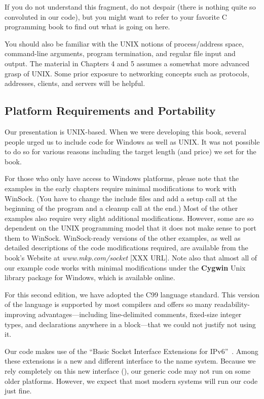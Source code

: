 If you do not understand this fragment, do not despair (there is
nothing quite so convoluted in our code), but you might want to refer
to your favorite C programming book to find out what is going on here.

You should also be familiar with the UNIX notions of process/address
space, command-line arguments, program termination, and regular file
input and output. The material in Chapters 4 and 5 assumes a somewhat
more advanced grasp of UNIX.  Some prior exposure to networking concepts
such as protocols, addresses, clients, and servers will be helpful.

\subsection*{Platform Requirements and Portability}

Our presentation is UNIX-based.  When we were developing this
book, several people urged us to include code for Windows as well as
UNIX.  It was not possible to do so for various reasons including the
target length (and price) we set for the book.

For those who only have access to Windows platforms, please note that
the examples in the early chapters require minimal modifications to work
with WinSock.  (You have to change the include files and add a setup
call at the beginning of the program and a cleanup call at the end.)
Most of the other examples also require very slight additional
modifications.  However, some are so dependent on the UNIX
programming model that it does not make sense to port them to WinSock.
%
WinSock-ready versions of the other examples, as well as detailed
descriptions of the code modifications required, are available from
the book's Website at \emph{www.mkp.com/socket} [XXX URL].  Note also that
almost all of our example code works with minimal modifications under
the \textbf{Cygwin} Unix library package for Windows, which is
available online.

For this second edition, we have adopted the C99 language standard.
This version of the language is supported by most compilers and offers
so many readability-improving advantages---including line-delimited
comments, fixed-size integer types,
and declarations anywhere in a block---that we could not
justify not using it.

Our code makes use of the ``Basic Socket Interface Extensions for
IPv6''~\cite{RFC3493}.
Among these extensions is a new and different interface to the name system.
Because we rely completely on this new interface
(), our generic code may not run on some older
platforms.  However, we expect that most modern systems will run our
code just fine.

